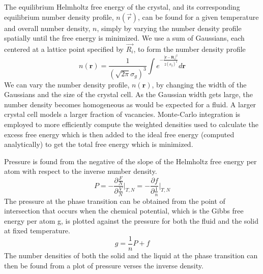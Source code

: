 \documentclass[letterpaper,twocolumn,amsmath,amssymb,prb]{revtex4-1}
\begin{document}
The equilibrium Helmholtz free energy of the crystal, and its corresponding 
equilibrium number density profile, $n(\vec{r})$, can be found for a given 
temperature and overall number density, $n$, simply by varying the number density profile spatially 
until the free energy
is minimized. 
We use a sum of 
Gaussians, each centered at a lattice point specified by $\vec{R_i}$, to form 
the number density profile 
\begin{equation}n(\textbf{r})= \frac{1}{\left(\sqrt{2\pi}\sigma_{g}\right)^3}
\int{e^{-\frac{|\textbf{r}-\textbf{R}_i|^2}{2\left(\sigma_g\right)^2}}d{\textbf{r}}}  \end{equation}  
We can vary the number density profile, $n(\textbf{r})$, by changing the width of the Gaussians
and the size of the crystal cell. \color{black}As the Gaussian width gets large, the number 
density becomes homogeneous as would be expected for a fluid. A larger crystal cell models a larger fraction 
of vacancies. Monte-Carlo integration is employed to more efficiently 
compute the weighted densities used to calculate the excess free energy which is then 
added to the ideal free energy (computed analytically) to get the total free energy 
which is minimized. 

Pressure is found from the negative of the slope of the Helmholtz 
free energy per atom with respect to the inverse number density. 
\begin{equation}{P=-\frac{\partial{\frac{F}{N}}}{\partial{\frac{V}{N}}}\bigg|_{T,N} 
= -\frac{\partial{f}}{\partial{\frac{1}{n}}}\bigg|_{T,N}}\end{equation} 
The pressure at the phase transition can be obtained from the point of intersection
that occurs when the chemical potential, which is the Gibbs free energy per atom g,
is plotted against the pressure for both the fluid and the solid at fixed temperature. 
\begin{equation}{g = \frac{1}{n}P + f}\end{equation}
The number densities of both the solid and the liquid at the phase transition can then
be found from a plot of pressure verses the inverse density. 
\end{document}
